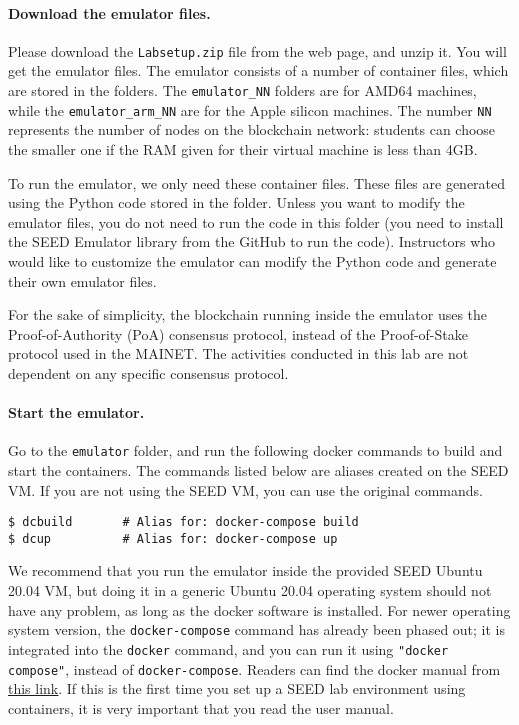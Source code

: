 

\paragraph{Download the emulator files.}
Please download the \texttt{Labsetup.zip} file from the web page, and
unzip it. You will get the emulator files. 
The emulator consists of a number of container files, which are stored 
in the  folders. The \texttt{emulator\_NN}
folders are for AMD64 machines, while the \texttt{emulator\_arm\_NN}
are for the Apple silicon machines. The number 
\texttt{NN} represents the number of nodes on the blockchain network:
students can choose the smaller one if the RAM given for their virtual 
machine is less than 4GB. 


To run the emulator, we 
only need these container files. These files are generated using
the Python code stored in the  folder. 
Unless you want to modify the emulator files, you do not 
need to run the code in this folder (you need to 
install the SEED Emulator library from the GitHub to run the code). 
Instructors who would like to customize the emulator can modify the Python
code and generate their own emulator files.

For the sake of simplicity, the blockchain running inside the emulator
uses the Proof-of-Authority (PoA) consensus protocol, instead of the
Proof-of-Stake protocol used in the MAINET. 
The activities conducted in this lab are not dependent on 
any specific consensus protocol.


\paragraph{Start the emulator.}
Go to the \texttt{emulator} folder, and run the following docker commands
to build and start the containers. The commands listed below are aliases 
created on the SEED VM.
If you are not using the SEED VM, you can use
the original commands. 

\begin{lstlisting}
$ dcbuild       # Alias for: docker-compose build
$ dcup          # Alias for: docker-compose up
\end{lstlisting}

We recommend that you run the emulator inside
the provided SEED Ubuntu 20.04 VM, but doing it in a generic Ubuntu 20.04 
operating system
should not have any problem, as long as the docker software is installed.
For newer operating system version, the \texttt{docker-compose} command 
has already been phased out; it is integrated into the \texttt{docker}
command, and you can run it using \texttt{"docker compose"},
instead of \texttt{docker-compose}.  
Readers can find the docker manual from
\href{https://github.com/seed-labs/seed-labs/blob/master/manuals/docker/SEEDManual-Container.md}
{\underline{this link}}.
If this is the first time you set up a SEED lab environment
using containers, it is very important that you read 
the user manual. 




